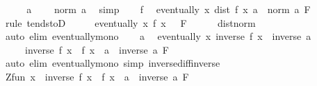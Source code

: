 \begin{isabellebody}
%
\isadelimproof
%
\endisadelimproof
%
\isatagproof
{}\isamarkupfalse%
\ {\isacharminus}{\kern0pt}\isanewline
\ \ \isamarkupfalse%
\ a\ \isamarkupfalse%
\ {\isachardoublequoteopen}{}\ {\isacharless}{\kern0pt}\ norm\ a{\isachardoublequoteclose}\ \isamarkupfalse%
\ simp\isanewline
\ \ \isamarkupfalse%
\ f\ \isamarkupfalse%
\ {\isachardoublequoteopen}eventually\ {\isacharparenleft}{\kern0pt}{\isasymlambda}x{\isachardot}{\kern0pt}\ dist\ {\isacharparenleft}{\kern0pt}f\ x{\isacharparenright}{\kern0pt}\ a\ {\isacharless}{\kern0pt}\ norm\ a{\isacharparenright}{\kern0pt}\ F{\isachardoublequoteclose}\isanewline
\ \ \ \ \isamarkupfalse%
\ {\isacharparenleft}{\kern0pt}rule\ tendstoD{\isacharparenright}{\kern0pt}\isanewline
\ \ \isamarkupfalse%
\ \isamarkupfalse%
\ {\isachardoublequoteopen}eventually\ {\isacharparenleft}{\kern0pt}{\isasymlambda}x{\isachardot}{\kern0pt}\ f\ x\ {\isasymnoteq}\ {}{\isacharparenright}{\kern0pt}\ F{\isachardoublequoteclose}\isanewline
\ \ \ \ \isamarkupfalse%
\ dist{\isacharunderscore}{\kern0pt}norm\ \isamarkupfalse%
\ {\isacharparenleft}{\kern0pt}auto\ elim{\isacharbang}{\kern0pt}{\isacharcolon}{\kern0pt}\ eventually{\isacharunderscore}{\kern0pt}mono{\isacharparenright}{\kern0pt}\isanewline
\ \ \isamarkupfalse%
\ a\ \isamarkupfalse%
\ {\isachardoublequoteopen}eventually\ {\isacharparenleft}{\kern0pt}{\isasymlambda}x{\isachardot}{\kern0pt}\ inverse\ {\isacharparenleft}{\kern0pt}f\ x{\isacharparenright}{\kern0pt}\ {\isacharminus}{\kern0pt}\ inverse\ a\ {\isacharequal}{\kern0pt}\isanewline
\ \ \ \ {\isacharminus}{\kern0pt}\ {\isacharparenleft}{\kern0pt}inverse\ {\isacharparenleft}{\kern0pt}f\ x{\isacharparenright}{\kern0pt}\ {\isacharasterisk}{\kern0pt}\ {\isacharparenleft}{\kern0pt}f\ x\ {\isacharminus}{\kern0pt}\ a{\isacharparenright}{\kern0pt}\ {\isacharasterisk}{\kern0pt}\ inverse\ a{\isacharparenright}{\kern0pt}{\isacharparenright}{\kern0pt}\ F{\isachardoublequoteclose}\isanewline
\ \ \ \ \isamarkupfalse%
\ {\isacharparenleft}{\kern0pt}auto\ elim{\isacharbang}{\kern0pt}{\isacharcolon}{\kern0pt}\ eventually{\isacharunderscore}{\kern0pt}mono\ simp{\isacharcolon}{\kern0pt}\ inverse{\isacharunderscore}{\kern0pt}diff{\isacharunderscore}{\kern0pt}inverse{\isacharparenright}{\kern0pt}\isanewline
\ \ \isamarkupfalse%
\ \isamarkupfalse%
\ {\isachardoublequoteopen}Zfun\ {\isacharparenleft}{\kern0pt}{\isasymlambda}x{\isachardot}{\kern0pt}\ {\isacharminus}{\kern0pt}\ {\isacharparenleft}{\kern0pt}inverse\ {\isacharparenleft}{\kern0pt}f\ x{\isacharparenright}{\kern0pt}\ {\isacharasterisk}{\kern0pt}\ {\isacharparenleft}{\kern0pt}f\ x\ {\isacharminus}{\kern0pt}\ a{\isacharparenright}{\kern0pt}\ {\isacharasterisk}{\kern0pt}\ inverse\ a{\isacharparenright}{\kern0pt}{\isacharparenright}{\kern0pt}\ F{\isachardoublequoteclose}\isanewline

\end{isabellebody}
